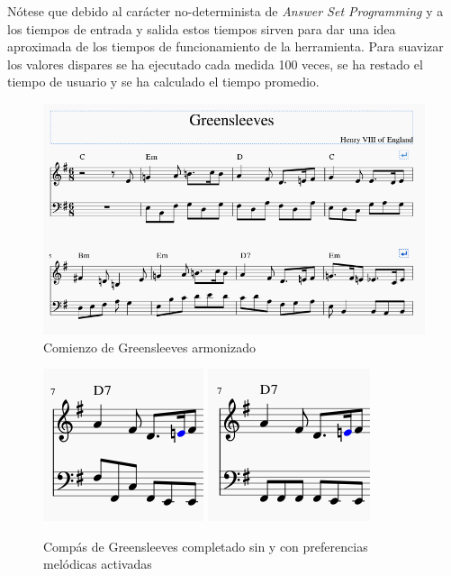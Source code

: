  Nótese que debido al carácter no-determinista de \textit{Answer Set Programming} y a los tiempos de entrada y salida estos tiempos sirven para dar una idea aproximada de los tiempos de funcionamiento de la herramienta. Para suavizar los valores dispares se ha ejecutado cada medida 100 veces, se ha restado el tiempo de usuario y se ha calculado el tiempo promedio. 
 

  \begin{figure}
  	\centering
  	\includegraphics[width=0.8\linewidth]{imagenes/evaluation/greensleeves_harm.png}
  	\caption{Comienzo de Greensleeves armonizado}
  	\label{fig:greensleeves_harm}
  \end{figure}
  
     \begin{figure}
     	\centering
     	\includegraphics[width=0.4\linewidth]{imagenes/evaluation/greensleeves_measure.png}
     	\includegraphics[width=0.4\linewidth]{imagenes/evaluation/greensleeves_measure_melodious.png}
     	\caption{Compás de Greensleeves completado sin y con preferencias melódicas activadas}
     	\label{fig:greensleeves_measure}
     \end{figure}
     
